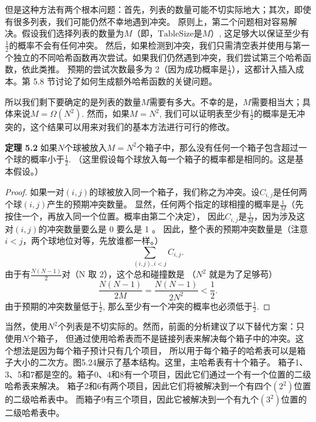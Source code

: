 \documentclass[a4paper]{ctexart}
\theoremstyle{definition}
\theoremstyle{definition}
\begin{document}
但是这种方法有两个根本问题：首先，列表的数量可能不切实际地大；其次，即使有很多列表，我们可能仍然不幸地遇到冲突。
原则上，第二个问题相对容易解决。假设我们选择列表的数量为\( M \)（即，\( \text{TableSize} \)是\( M \)）, 这足够大以保证至少有\( \frac{1}{2} \)的概率不会有任何冲突。
然后，如果检测到冲突，我们只需清空表并使用与第一个独立的不同哈希函数再次尝试。如果我们仍然遇到冲突，我们尝试第三个哈希函数，依此类推。
预期的尝试次数最多为 2（因为成功概率是\( \frac{1}{2} \)），这都计入插入成本。第 5.8 节讨论了如何生成额外哈希函数的关键问题。

所以我们剩下要确定的是列表的数量\( M \)需要有多大。不幸的是，\( M \)需要相当大；具体来说\( M = \Omega(N^2) \). 
然而，如果\( M = N^2 \), 我们可以证明表至少有\( \frac{1}{2} \)的概率是无冲突的，这个结果可以用来对我们的基本方法进行可行的修改。

\textbf{定理 5.2} 如果\( N \)个球被放入\( M = N^2 \)个箱子中，那么没有任何一个箱子包含超过一个球的概率小于\( \frac{1}{2} \).
（这里假设每个球放入每一个箱子的概率都是相同的。这是基本假设。）
\begin{proof}
  如果一对\( (i, j) \)的球被放入同一个箱子，我们称之为冲突。设\( C_{i,j} \)是任何两个球\( (i, j) \)产生的预期冲突数量。
  显然，任何两个指定的球相撞的概率是\( \frac{1}{M} \)（先按住一个，再放入同一个位置。概率由第二个决定），
  因此\( C_{i,j} \)是\( \frac{1}{M} \)，因为涉及这对\( (i, j) \)的冲突数量要么是 0 要么是 1 。
  因此，整个表的预期冲突数量是（注意 $i < j$，两个球地位对等，先放谁都一样。）
  $$
  \sum_{(i,j), i<j} C_{i,j}.
  $$
  由于有\( \frac{N(N-1)}{2} \)对（N 取 2），这个总和碰撞数是 （$N^2$ 就是为了足够苟）
  $$ 
  \frac{N(N-1)}{2M} = \frac{N(N-1)}{2N^2} < \frac{1}{2}.
  $$
  由于预期的冲突数量低于\( \frac{1}{2} \), 那么至少有一个冲突的概率也必须低于\( \frac{1}{2} \).
\end{proof} 

当然，使用\( N^2 \)个列表是不切实际的。然而，前面的分析建议了以下替代方案：只使用\( N \)个箱子，
但通过使用哈希表而不是链接列表来解决每个箱子中的冲突。这个想法是因为每个箱子预计只有几个项目，
所以用于每个箱子的哈希表可以是箱子大小的二次方。图5.24展示了基本结构。这里，主哈希表有十个箱子。
箱子1、3、5和7都是空的。箱子0、4和8有一个项目，因此它们通过一个有一个位置的二级哈希表来解决。
箱子2和6有两个项目，因此它们将被解决到一个有四个\( (2^2) \)位置的二级哈希表中。
而箱子9有三个项目，因此它被解决到一个有九个\( (3^2) \)位置的二级哈希表中。
\end{document}
